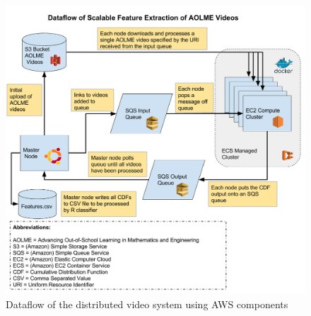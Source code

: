 \begin{figure}[h]
  \centering
  \includegraphics[width=\textwidth]{figures/extract_features_dataflow}
  \caption{Dataflow of the distributed video system using AWS components}
  \label{fig:dataflow}
\end{figure}

